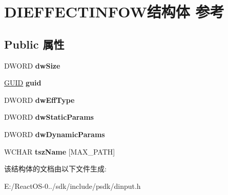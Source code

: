\hypertarget{struct_d_i_e_f_f_e_c_t_i_n_f_o_w}{}\section{D\+I\+E\+F\+F\+E\+C\+T\+I\+N\+F\+O\+W结构体 参考}
\label{struct_d_i_e_f_f_e_c_t_i_n_f_o_w}
\subsection*{Public 属性}
\begin{DoxyCompactItemize}
\item 
\mbox{\label{struct_d_i_e_f_f_e_c_t_i_n_f_o_w_a820595aa7bc69a463565856e34daf4a5}} 
D\+W\+O\+RD {\bfseries dw\+Size}
\item 
\mbox{\label{struct_d_i_e_f_f_e_c_t_i_n_f_o_w_a4696339b419d8ea35dc1d6e312c9ecb8}} 
\hyperlink{interface_g_u_i_d}{G\+U\+ID} {\bfseries guid}
\item 
\mbox{\label{struct_d_i_e_f_f_e_c_t_i_n_f_o_w_acdb727d3626c2e5475549bf13dd2a8fb}} 
D\+W\+O\+RD {\bfseries dw\+Eff\+Type}
\item 
\mbox{\label{struct_d_i_e_f_f_e_c_t_i_n_f_o_w_a7fd9402627d981ee7e4ff926b277b609}} 
D\+W\+O\+RD {\bfseries dw\+Static\+Params}
\item 
\mbox{\label{struct_d_i_e_f_f_e_c_t_i_n_f_o_w_a5aa1820b19027c5638131493592ecfdd}} 
D\+W\+O\+RD {\bfseries dw\+Dynamic\+Params}
\item 
\mbox{\label{struct_d_i_e_f_f_e_c_t_i_n_f_o_w_a8acc113a5531cfa393b6167466b9952c}} 
W\+C\+H\+AR {\bfseries tsz\+Name} \mbox{[}M\+A\+X\+\_\+\+P\+A\+TH\mbox{]}
\end{DoxyCompactItemize}


该结构体的文档由以下文件生成\+:\begin{DoxyCompactItemize}
\item 
E\+:/\+React\+O\+S-\/0../sdk/include/psdk/dinput.\+h\end{DoxyCompactItemize}
